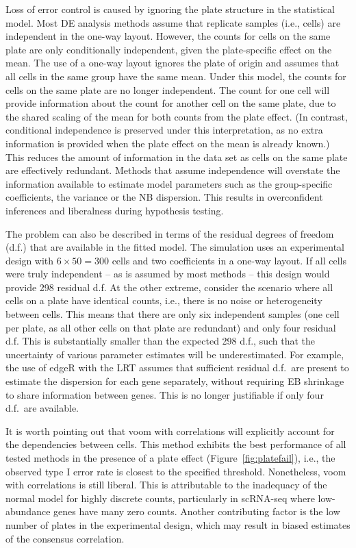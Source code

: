 \documentclass[oupdraft]{bio}
\begin{document}
Loss of error control is caused by ignoring the plate structure in the statistical model.
Most DE analysis methods assume that replicate samples (i.e., cells) are independent in the one-way layout.
However, the counts for cells on the same plate are only conditionally independent, given the plate-specific effect on the mean.
The use of a one-way layout ignores the plate of origin and assumes that all cells in the same group have the same mean.
Under this model, the counts for cells on the same plate are no longer independent.
The count for one cell will provide information about the count for another cell on the same plate,
    due to the shared scaling of the mean for both counts from the plate effect.
(In contrast, conditional independence is preserved under this interpretation, as no extra information is provided when the plate effect on the mean is already known.)
This reduces the amount of information in the data set as cells on the same plate are effectively redundant.
Methods that assume independence will overstate the information available to estimate model parameters such as the group-specific coefficients, the variance or the NB dispersion.
This results in overconfident inferences and liberalness during hypothesis testing.

The problem can also be described in terms of the residual degrees of freedom (d.f.) that are available in the fitted model.
The simulation uses an experimental design with $6 \times 50 =  300$ cells and two coefficients in a one-way layout.
If all cells were truly independent -- as is assumed by most methods -- this design would provide 298 residual d.f. 
At the other extreme, consider the scenario where all cells on a plate have identical counts, i.e., there is no noise or heterogeneity between cells.
This means that there are only six independent samples (one cell per plate, as all other cells on that plate are redundant) and only four residual d.f.
This is substantially smaller than the expected 298 d.f., such that the uncertainty of various parameter estimates will be underestimated.
For example, the use of edgeR with the LRT assumes that sufficient residual d.f.\ are present to estimate the dispersion for each gene separately,
    without requiring EB shrinkage to share information between genes.
This is no longer justifiable if only four d.f.\ are available.

It is worth pointing out that voom with correlations will explicitly account for the dependencies between cells.
This method exhibits the best performance of all tested methods in the presence of a plate effect (Figure~\ref{fig:platefail}),
    i.e., the observed type I error rate is closest to the specified threshold.
Nonetheless, voom with correlations is still liberal.
This is attributable to the inadequacy of the normal model for highly discrete counts, particularly in scRNA-seq where low-abundance genes have many zero counts.
Another contributing factor is the low number of plates in the experimental design, which may result in biased estimates of the consensus correlation.
\end{document}
